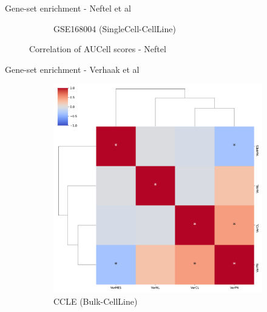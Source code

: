 \documentclass[aspectratio=169,9pt]{beamer}
\begin{document}
\begin{frame}{Gene-set enrichment - Neftel et al}
\begin{adjustwidth}{-5cm}{-5cm}
\begin{figure}
\begin{subfigure}[c]{0.48\textwidth}
                    \caption{GSE168004 (SingleCell-CellLine)}
                \end{subfigure}
                \caption{Correlation of AUCell scores - Neftel}
            \end{figure}
        \end{adjustwidth}
    \end{frame}

    \begin{frame}{Gene-set enrichment - Verhaak et al}
        \begin{adjustwidth}{-5cm}{-5cm}
            \centering
            \begin{figure}\ContinuedFloat
                \centering
                \begin{subfigure}[c]{0.48\textwidth}
                    \centering
                    \includegraphics[width=\textwidth]{GSEA_CCLE_corrplot_Ver}
                    \caption{CCLE (Bulk-CellLine)}
                \end{subfigure}
                \begin{subfigure}[c]{0.48\textwidth}
                    \centering

\end{subfigure}
\end{figure}
\end{adjustwidth}
\end{frame}
\end{document}
